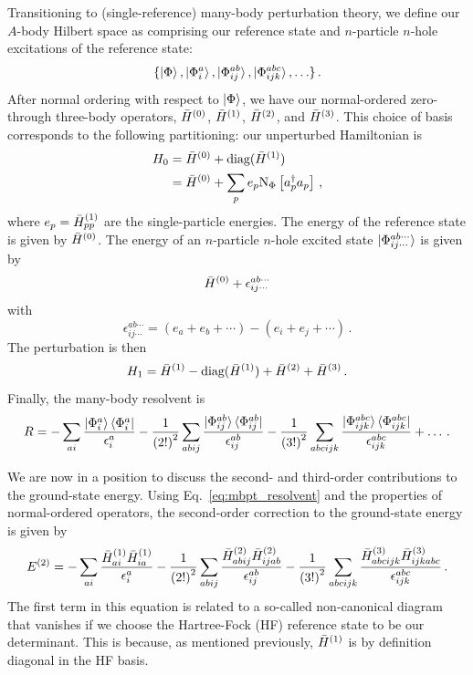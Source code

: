 Transitioning to (single-reference) many-body perturbation theory,
we define our $A$-body Hilbert space as comprising our reference state
and $n$-particle $n$-hole excitations of the reference state:
\begin{equation}
  \{\ket{\Phi}, \ket{\Phi_{i}^{a}}, \ket{\Phi_{ij}^{ab}}, \ket{\Phi_{ijk}^{abc}}, \ldots \}\,.
\end{equation}
After normal ordering with respect to $\ket{\Phi}$,
we have our normal-ordered zero- through three-body operators,
${\bar{H}}^{(0)}$, ${\bar{H}}^{(1)}$, ${\bar{H}}^{(2)}$, and ${\bar{H}}^{(3)}$.
This choice of basis corresponds to the following partitioning:
our unperturbed Hamiltonian is
\begin{align}
  H_0 &= {\bar{H}}^{(0)} + \text{diag}({\bar{H}}^{(1)}) \\
      &= {\bar{H}}^{(0)} + \sum_{p} e_p \text{N}_{\Phi}\left[a_{p}^{\dagger} a_{p}\right]\,,
\end{align}
where $e_p = {\bar{H}}^{(1)}_{pp}$ are the single-particle energies.
The energy of the reference state is given by ${\bar{H}}^{(0)}$.
The energy of an $n$-particle $n$-hole excited state $\ket{\Phi_{ij\cdots}^{ab\cdots}}$ is given by
\begin{equation}
  {\bar{H}}^{(0)} + \epsilon_{ij\cdots}^{ab\cdots}
\end{equation}
with
\begin{equation}\label{eq:mp_energy_denom}
  \epsilon_{ij\cdots}^{ab\cdots} = (e_a + e_b + \cdots) - (e_i + e_j + \cdots)\,.
\end{equation}
The perturbation is then
\begin{equation}
  H_1 = {\bar{H}}^{(1)} - \text{diag}({\bar{H}}^{(1)}) + {\bar{H}}^{(2)} + {\bar{H}}^{(3)}\,.
\end{equation}
Finally, the many-body resolvent is
\begin{equation}\label{eq:mbpt_resolvent}
  R = -\sum_{ai} \frac{\ket{\Phi_{i}^{a}}\bra{\Phi_{i}^{a}}}{\epsilon_{i}^{a}}
      -\frac{1}{{(2!)}^2} \sum_{abij}\frac{\ket{\Phi_{ij}^{ab}}\bra{\Phi_{ij}^{ab}}}{\epsilon_{ij}^{ab}}
      -\frac{1}{{(3!)}^2} \sum_{abcijk}\frac{\ket{\Phi_{ijk}^{abc}}\bra{\Phi_{ijk}^{abc}}}{\epsilon_{ijk}^{abc}}
      + \ldots \,.
\end{equation}

We are now in a position to discuss the second- and third-order contributions to the ground-state energy.
Using Eq.~\ref{eq:mbpt_resolvent} and the properties of normal-ordered operators,
the second-order correction to the ground-state energy is given by
\begin{equation}
    E^{(2)} = -\sum_{ai} \frac{{\bar{H}}^{(1)}_{ai}{\bar{H}}^{(1)}_{ia}}{\epsilon_{i}^{a}}
      -\frac{1}{{(2!)}^2} \sum_{abij}\frac{{\bar{H}}^{(2)}_{abij}{\bar{H}}^{(2)}_{ijab}}{\epsilon_{ij}^{ab}}
      -\frac{1}{{(3!)}^2} \sum_{abcijk}\frac{{\bar{H}}^{(3)}_{abcijk}{\bar{H}}^{(3)}_{ijkabc}}{\epsilon_{ijk}^{abc}}\,.
\end{equation}
The first term in this equation is related to a so-called non-canonical diagram
that vanishes if we choose the Hartree-Fock (HF) reference state to be our determinant.
This is because, as mentioned previously, ${\bar{H}}^{(1)}$ is by definition diagonal in the HF basis.


